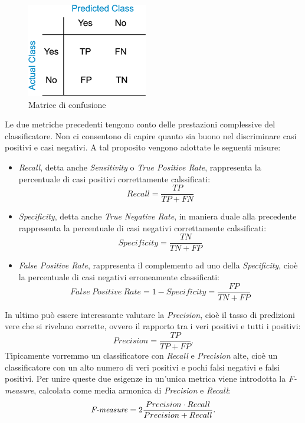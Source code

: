 \begin{figure}[]
\centering
  \includegraphics[width=0.3 \textwidth]{images/confusionmatrix}
  \caption{Matrice di confusione}
  \label{fig:confusione}
\end{figure}


Le due metriche precedenti tengono conto delle prestazioni complessive del classificatore. Non ci consentono di capire quanto sia buono nel discriminare casi positivi e casi negativi. A tal proposito vengono adottate le seguenti misure:
\begin{itemize}
\item \emph{Recall}, detta anche \emph{Sensitivity} o \emph{True Positive Rate}, rappresenta la percentuale di casi positivi correttamente calssificati:
\begin{equation*}
Recall = \frac{TP}{TP+FN}
\end{equation*}
\item \emph{Specificity}, detta anche  \emph{True Negative Rate}, in maniera duale alla precedente rappresenta la percentuale di casi negativi correttamente calssificati:
\begin{equation*}
Specificity = \frac{TN}{TN+FP}
\end{equation*}
\item \emph{False Positive Rate}, rappresenta il complemento ad uno della \emph{Specificity}, cioè la percentuale di casi negativi erroneamente classificati:
\begin{equation*}
False~Positive~Rate = 1 - Specificity =  \frac{FP}{TN+FP}
\end{equation*}
\end{itemize}
In ultimo può essere interessante valutare la \emph{Precision}, cioè il tasso di predizioni vere che si rivelano corrette, ovvero il rapporto tra i veri positivi e tutti i positivi:
\begin{equation*}
Precision = \frac{TP}{TP+FP}.
\end{equation*}
Tipicamente vorremmo un classificatore con \emph{Recall} e \emph{Precision} alte, cioè un classificatore con un alto numero di veri positivi e pochi falsi negativi e falsi positivi. Per unire queste due esigenze in un'unica metrica viene introdotta la \emph{F-measure}, calcolata come media armonica di \emph{Precision} e \emph{Recall}:
\begin{equation*}
\text{\emph{F-measure}} = 2\frac{Precision \cdot Recall}{Precision+Recall}.
\end{equation*}


